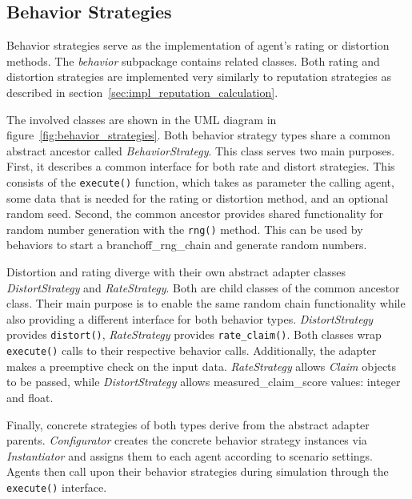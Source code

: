 \documentclass[%
    ]{\PathToTumTemplate/thesis/tum_thesis}
\begin{document}
\subsection{Behavior Strategies}
Behavior strategies serve as the implementation of agent's rating or distortion methods.
The \emph{behavior} subpackage contains related classes.
Both rating and distortion strategies are implemented very similarly to reputation strategies as described in section~\ref{sec:impl_reputation_calculation}.

The involved classes are shown in the UML diagram in figure~\ref{fig:behavior_strategies}.
Both behavior strategy types share a common abstract ancestor called \emph{BehaviorStrategy}.
This class serves two main purposes.
First, it describes a common interface for both rate and distort strategies.
This consists of the \lstinline{execute()} function, which takes as parameter the calling agent, some data that is needed for the rating or distortion method, and an optional random seed.
Second, the common ancestor provides shared functionality for random number generation with the \lstinline{rng()} method.
This can be used by behaviors to start a \gls{branchoff_rng_chain} and generate random numbers.

Distortion and rating diverge with their own abstract adapter classes \emph{DistortStrategy} and \emph{RateStrategy}.
Both are child classes of the common ancestor class.
Their main purpose is to enable the same random chain functionality while also providing a different interface for both behavior types.
\emph{DistortStrategy} provides \texttt{distort()}, \emph{RateStrategy} provides \texttt{rate\_claim()}.
Both classes wrap \texttt{execute()} calls to their respective behavior calls.
Additionally, the adapter makes a preemptive check on the input data.
\emph{RateStrategy} allows \emph{Claim} objects to be passed, while \emph{DistortStrategy} allows \gls{measured_claim_score} values: integer and float.

Finally, concrete strategies of both types derive from the abstract adapter parents.
\emph{Configurator} creates the concrete behavior strategy instances via \emph{Instantiator} and assigns them to each agent according to scenario settings.
Agents then call upon their behavior strategies during simulation through the \texttt{execute()} interface.
\end{document}
